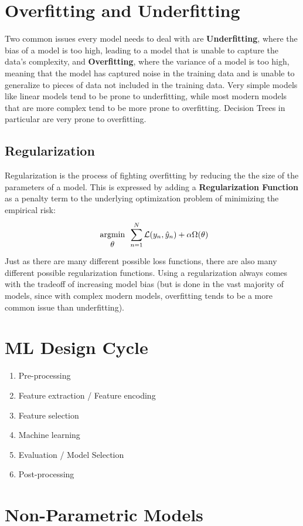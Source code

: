 \documentclass{report}
\newcommand{\tbf}{\textbf}
\newcommand{\argmin}[1] {
    \begin{array}{c}
        \vphantom{#1}\\ %
        \text{argmin}\\
        #1\\
        \end{array}
    }
\begin{document}
\section{Overfitting and Underfitting}
Two common issues every model needs to deal with are \tbf{Underfitting}, where the bias of a model is too high, leading to a model that is unable to capture the data's complexity, and \tbf{Overfitting}, where the variance of a model is too high, meaning that the model has captured noise in the training data and is unable to generalize to pieces of data not included in the training data. Very simple models like linear models tend to be prone to underfitting, while most modern models that are more complex tend to be more prone to overfitting. Decision Trees in particular are very prone to overfitting.
%
\subsection{Regularization}
Regularization is the process of fighting overfitting by reducing the the size of the parameters of a model. This is expressed by adding a \tbf{Regularization Function} as a penalty term to the underlying optimization problem of minimizing the empirical risk:
\begin{equation*}
\argmin{\theta} \sum_{n=1}^N \mathcal{L}(y_n, \hat{y}_n) + \alpha \Omega(\theta)
\end{equation*}
Just as there are many different possible loss functions, there are also many different possible regularization functions. Using a regularization always comes with the tradeoff of increasing model bias (but is done in the vast majority of models, since with complex modern models, overfitting tends to be a more common issue than underfitting).
%
\section{ML Design Cycle}
\begin{enumerate}
 \item Pre-processing
 \item Feature extraction / Feature encoding
 \item Feature selection
 \item Machine learning
 \item Evaluation / Model Selection
 \item Post-processing
\end{enumerate}
%
\section{Non-Parametric Models}
\end{document}
